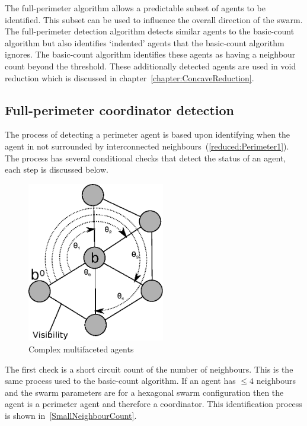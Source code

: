 The full-perimeter algorithm allows a predictable subset of agents to be identified. This subset can be used to influence the overall direction of the swarm. The full-perimeter detection algorithm detects similar agents to the basic-count algorithm but also identifies `indented' agents that the basic-count algorithm ignores. The basic-count algorithm identifies these agents as having a neighbour count beyond the threshold. These additionally detected agents are used in void reduction which is discussed in chapter~\ref{chapter:ConcaveReduction}.

\subsection{Full-perimeter coordinator detection}\label{sec:PerimeterAgentDetection} 
The process of detecting a perimeter agent is based upon identifying when the agent in not surrounded by interconnected neighbours~(\autoref{reduced:Perimeter1}). The process has several conditional checks that detect the status of an agent, each step is discussed below. 

\begin{figure}[H]
\begin{center}
\includegraphics[width=6cm]{CHAPTER-6/figures/Perimeter1}
\end{center}
\caption{Complex multifaceted agents \label{reduced:Perimeter1}}
\end{figure}

The first check is a short circuit count of the number of neighbours. This is the same process used to the basic-count algorithm. If an agent has $\leq 4$ neighbours and the swarm parameters are for a hexagonal swarm configuration then the agent is a perimeter agent and therefore a coordinator. This identification process is shown in~\autoref{SmallNeighbourCount}. 

